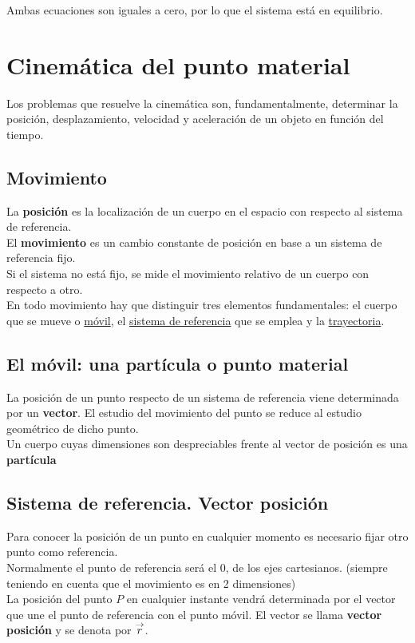 Ambas ecuaciones son iguales a cero, por lo que el sistema está en equilibrio.

\section{Cinemática del punto material}
Los problemas que resuelve la cinemática son, fundamentalmente, determinar la posición, desplazamiento, velocidad y aceleración de un objeto en función del tiempo.

\subsection{Movimiento}
La \textbf{posición} es la localización de un cuerpo en el espacio con respecto al sistema de referencia.\\
El \textbf{movimiento} es un cambio constante de posición en base a un sistema de referencia fijo.\\
Si el sistema no está fijo, se mide el movimiento relativo de un cuerpo con respecto a otro.\\
En todo movimiento hay que distinguir tres elementos fundamentales: el cuerpo que se
mueve o \underline{móvil}, el \underline{sistema de referencia} que se emplea y la \underline{trayectoria}.

\subsection{El móvil: una partícula o punto material}
La posición de un punto respecto de un sistema de referencia viene determinada por un \textbf{vector}. El estudio del movimiento del punto se reduce al estudio geométrico de dicho punto.\\
Un cuerpo cuyas dimensiones son despreciables frente al vector de posición es una
\textbf{partícula}

\subsection{Sistema de referencia. Vector posición}
Para conocer la posición de un punto en cualquier momento es necesario fijar otro punto como referencia.\\
Normalmente el punto de referencia será el 0, de los ejes cartesianos. (siempre teniendo en cuenta que el movimiento es en 2 dimensiones)\\
La posición del punto $P$ en cualquier instante vendrá determinada por el vector que une el punto de referencia con el punto móvil. El vector se llama \textbf{vector posición} y se denota por $\stackrel{\to}{r}$.

